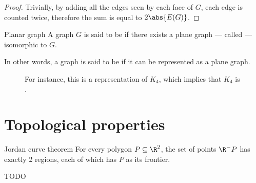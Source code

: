 \documentclass[a4paper, 12pt]{report}
\begin{document}
    \begin{proof}
        Trivially, by adding all the edges seen by each face of $G$, each edge is counted twice, therefore the sum is equal to $2 \abs{E(G)}$.
    \end{proof}

    \begin{frameddefn}{Planar graph}
        A graph $G$ is said to be  if there exists a plane graph --- called  --- isomorphic to $G$.
    \end{frameddefn}

    In other words, a graph is said to be  if it can be represented as a plane graph.

    \begin{figure}[H]
        \centering
        \caption{For instance, this is a  representation of $K_4$, which implies that $K_4$ is .}
        \label{k4 planar}
    \end{figure}

    \section{Topological properties}

    \begin{framedthm}{Jordan curve theorem}
        For every polygon $P \subseteq \R^2$, the set of points $\R^ - P$ has exactly 2 regions, each of which has $P$ as its frontier.
    \end{framedthm}

    TODO 
    
\end{document}
